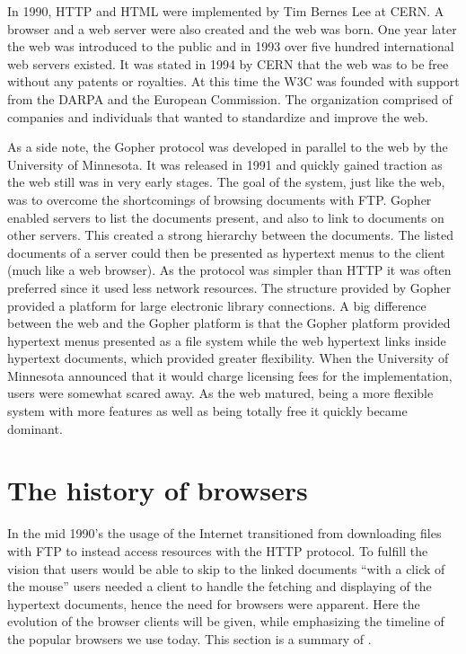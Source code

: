     In 1990, \gls{HTTP} and \gls{HTML} were implemented by Tim Bernes Lee at \gls{CERN}.
    A \gls{browser} and a \gls{web} server were also created and the \gls{web} was born.
    One year later the \gls{web} was introduced to the public and in 1993 over five hundred international \gls{web} servers existed.
    It was stated in 1994 by \gls{CERN} that the \gls{web} was to be free without any patents or royalties.
    At this time the \gls{W3C} was founded with support from the \gls{DARPA} and the European Commission.
    The organization comprised of companies and individuals that wanted to standardize and improve the \gls{web}.

    As a side note, the Gopher protocol was developed in parallel to the web by the University of Minnesota.
    It was released in 1991 and quickly gained traction as the \gls{web} still was in very early stages.
    The goal of the system, just like the \gls{web}, was to overcome the shortcomings of browsing \glspl{document} with \gls{FTP}.
    Gopher enabled servers to list the \glspl{document} present, and also to link to \glspl{document} on other servers.
    This created a strong hierarchy between the \glspl{document}.
    The listed \glspl{document} of a server could then be presented as \gls{hypertext} menus to the client (much like a \gls{web} \gls{browser}).
    As the protocol was simpler than \gls{HTTP} it was often preferred since it used less network resources.
    The structure provided by Gopher provided a platform for large electronic library connections.
    A big difference between the \gls{web} and the Gopher platform is that the Gopher platform provided \gls{hypertext} menus presented as a file system while the \gls{web} \gls{hypertext} links inside \gls{hypertext} \glspl{document}, which provided greater flexibility.
    When the University of Minnesota announced that it would charge licensing fees for the implementation, users were somewhat scared away.
    As the \gls{web} matured, being a more flexible system with more features as well as being totally free it quickly became dominant.

  \section{The history of browsers}
    \label{sec:browsers}
    \begin{metatext}
      In the mid 1990's the usage of the Internet transitioned from downloading files with \gls{FTP} to instead access resources with the \gls{HTTP} protocol.
      To fulfill the vision that users would be able to skip to the linked \glspl{document} ``with a click of the mouse'' users needed a client to handle the fetching and displaying of the \gls{hypertext} \glspl{document}, hence the need for \glspl{browser} were apparent.
      Here the evolution of the \gls{browser} clients will be given, while emphasizing the timeline of the popular \glspl{browser} we use today.
      This section is a summary of .
    \end{metatext}

